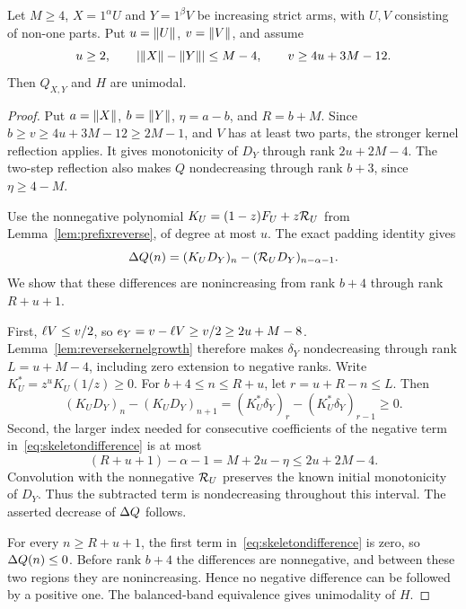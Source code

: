 \begin{theorem}\label{thm:skeletonimbalance}
Let $M\ge4$, $X=1^\alpha U$ and $Y=1^\beta V$ be increasing strict arms, with $U,V$ consisting of non-one parts. Put $u=\lVert U\rVert$, $v=\lVert V\rVert$, and assume
\[
 u\ge2,\qquad |\lVert X\rVert-\lVert Y\rVert|\le M-4,\qquad v\ge4u+3M-12.
\]
Then $Q_{X,Y}$ and $H$ are unimodal.
\end{theorem}
\begin{proof}
Put $a=\lVert X\rVert$, $b=\lVert Y\rVert$, $\eta=a-b$, and $R=b+M$. Since $b\ge v\ge4u+3M-12\ge2M-1$, and $V$ has at least two parts, the stronger kernel reflection applies. It gives monotonicity of $D_Y$ through rank $2u+2M-4$. The two-step reflection also makes $Q$ nondecreasing through rank $b+3$, since $\eta\ge4-M$.

Use the nonnegative polynomial $K_U=(1-z)F_U+z\mathcal R_U$ from Lemma~\ref{lem:prefixreverse}, of degree at most $u$. The exact padding identity gives
\begin{equation}\label{eq:skeletondifference}
 \Delta Q(n)=(K_UD_Y)_n-(\mathcal R_UD_Y)_{n-\alpha-1}.
\end{equation}
We show that these differences are nonincreasing from rank $b+4$ through rank $R+u+1$.

First, $\ell V\le v/2$, so $e_Y=v-\ell V\ge v/2\ge2u+M-8$. Lemma~\ref{lem:reversekernelgrowth} therefore makes $\delta_Y$ nondecreasing through rank $L=u+M-4$, including zero extension to negative ranks. Write $K_U^*=z^uK_U(1/z)\ge0$. For $b+4\le n\le R+u$, let $r=u+R-n\le L$. Then
\[
 (K_UD_Y)_n-(K_UD_Y)_{n+1}
 =(K_U^*\delta_Y)_r-(K_U^*\delta_Y)_{r-1}\ge0.
\]
Second, the larger index needed for consecutive coefficients of the negative term in~\eqref{eq:skeletondifference} is at most
\[
 (R+u+1)-\alpha-1=M+2u-\eta\le2u+2M-4.
\]
Convolution with the nonnegative $\mathcal R_U$ preserves the known initial monotonicity of $D_Y$. Thus the subtracted term is nondecreasing throughout this interval. The asserted decrease of $\Delta Q$ follows.

For every $n\ge R+u+1$, the first term in~\eqref{eq:skeletondifference} is zero, so $\Delta Q(n)\le0$. Before rank $b+4$ the differences are nonnegative, and between these two regions they are nonincreasing. Hence no negative difference can be followed by a positive one. The balanced-band equivalence gives unimodality of $H$.
\end{proof}


